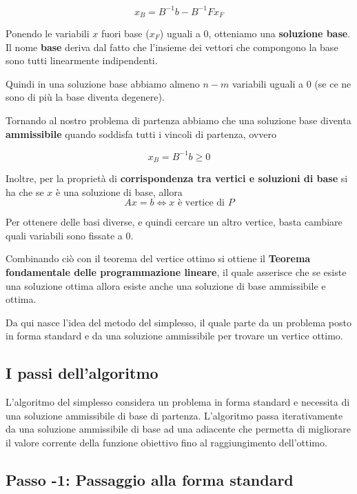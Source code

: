 $$
x_B = B^{-1}b - B^{-1}F x_F
$$

\noindent Ponendo le variabili $x$ fuori base ($x_F$) uguali a 0, otteniamo una \textbf{soluzione base}.
Il nome \textbf{base} deriva dal fatto che l'insieme dei vettori che compongono la base sono tutti linearmente indipendenti.

Quindi in una soluzione base abbiamo almeno $n-m$ variabili uguali a 0 (se ce ne sono di più la base diventa degenere).

Tornando al nostro problema di partenza abbiamo che una soluzione base diventa \textbf{ammissibile} quando soddisfa tutti i vincoli di partenza, ovvero

$$
x_B = B^{-1}b \geq 0
$$

\noindent Inoltre, per la proprietà di \textbf{corrispondenza tra vertici e soluzioni di base} si ha che se $x$ è una soluzione di base, allora
\begin{equation}
Ax = b \Leftrightarrow x \text{ è vertice di }P 
\end{equation} 
 
Per ottenere delle basi diverse, e quindi cercare un altro vertice, basta cambiare quali variabili sono fissate a 0.

Combinando ciò con il teorema del vertice ottimo si ottiene il \textbf{Teorema fondamentale delle programmazione lineare}, il quale asserisce che se esiste una soluzione ottima allora esiste anche una soluzione di base ammissibile e ottima.

Da qui nasce l'idea del metodo del simplesso, il quale parte da un problema posto in forma standard e da una soluzione ammissibile per trovare un vertice ottimo.

\subsection{I passi dell'algoritmo}

L'algoritmo del simplesso considera un problema in forma standard e necessita di una soluzione ammissibile di base di partenza.
L'algoritmo passa iterativamente da una soluzione ammissibile di base ad una adiacente che permetta di migliorare il valore corrente della funzione obiettivo fino al raggiungimento dell'ottimo.

\subsection{Passo -1: Passaggio alla forma standard}

